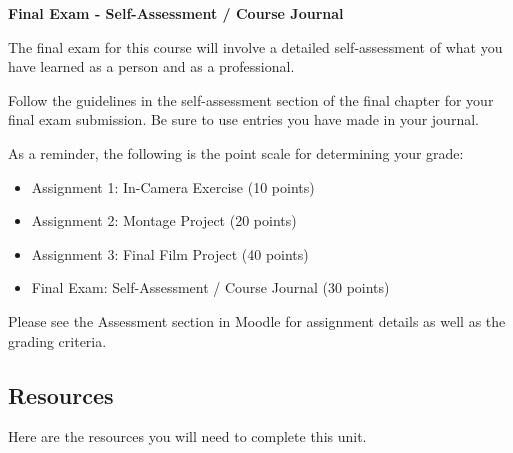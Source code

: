 \documentclass[
  letterpaper,
  DIV=11,
  numbers=noendperiod]{scrreprt}
\providecommand{\tightlist}{%
  \setlength{\itemsep}{0pt}\setlength{\parskip}{0pt}}\usepackage{longtable,booktabs,array}
\begin{document}
\textbf{Final Exam - Self-Assessment / Course Journal}

The final exam for this course will involve a detailed self-assessment
of what you have learned as a person and as a professional.

Follow the guidelines in the self-assessment section of the final
chapter for your final exam submission. Be sure to use entries you have
made in your journal.

As a reminder, the following is the point scale for determining your
grade:

\begin{itemize}
\tightlist
\item
  Assignment 1: In-Camera Exercise (10 points)
\item
  Assignment 2: Montage Project (20 points)
\item
  Assignment 3: Final Film Project (40 points)
\item
  Final Exam: Self-Assessment / Course Journal (30 points)
\end{itemize}

\begin{tcolorbox}[enhanced jigsaw, leftrule=.75mm, bottomrule=.15mm, colback=white, colframe=quarto-callout-note-color-frame, left=2mm, opacityback=0, rightrule=.15mm, breakable, arc=.35mm, toprule=.15mm]
\begin{minipage}[t]{5.5mm}
\textcolor{quarto-callout-note-color}{\faInfo}
\end{minipage}%
\begin{minipage}[t]{\textwidth - 5.5mm}

Please see the Assessment section in Moodle for assignment details as
well as the grading criteria.

\end{minipage}%
\end{tcolorbox}

\subsection*{Resources}\label{resources-9}

Here are the resources you will need to complete this unit.
\end{document}
